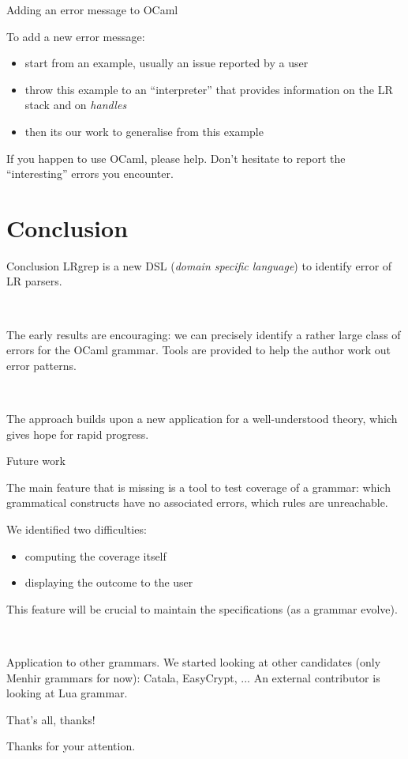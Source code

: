\documentclass[aspectratio=169]{beamer}          %
\begin{document}
\begin{frame}{Adding an error message to OCaml}

  To add a new error message:
  \begin{itemize}
    \item start from an example, usually an issue reported by a user
    \item throw this example to an ``interpreter'' that provides information on the LR stack and on {\em handles}
    \item then its our work to generalise from this example
  \end{itemize}
  \pause
  \begin{block}{If you happen to use OCaml, please help.}
    Don't hesitate to report the ``interesting'' errors you encounter.
  \end{block}
\end{frame}

\section{Conclusion}

\begin{frame}{Conclusion}
  LRgrep is a new DSL ({\em domain specific language}) to identify error of LR parsers.

\

  The early results are encouraging: we can precisely identify a rather large class of errors for the OCaml grammar. Tools are provided to help the author work out error patterns.

\

  The approach builds upon a new application for a well-understood theory, which gives hope for rapid progress.

\end{frame}

\begin{frame}{Future work}

  The main feature that is missing is a tool to test coverage of a grammar:
  which grammatical constructs have no associated errors, which rules are unreachable.

  We identified two difficulties:
\begin{itemize}
  \item computing the coverage itself
  \item displaying the outcome to the user
\end{itemize}

This feature will be crucial to maintain the specifications (as a grammar evolve).

\

\pause
Application to other grammars. We started looking at other candidates (only Menhir grammars for now): Catala, EasyCrypt, ...
An external contributor is looking at Lua grammar.

\end{frame}

\begin{frame}{That's all, thanks!}

  Thanks for your attention.

\end{frame}
\end{document}
